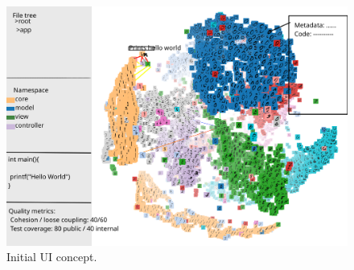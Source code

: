 \begin{figure}[H]
    \centering
    \includegraphics[width=\textwidth]{inc/images/tensorVisualization.png}
    \caption{Initial UI concept.}
    \label{fig:uiConcept}
\end{figure}